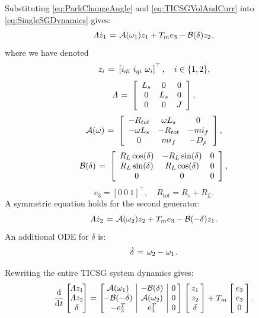 \documentclass[letterpaper,10pt,conference]{ieeeconf}
\renewcommand{\o}    {{\omega}}
\newcommand{\m}      {{\hbox{\hskip 1pt}}}
\newcommand{\nm}     {{\hbox{\hskip -3pt}}}
\newcommand{\dd}     {{\rm d\hbox{\hskip 0.5pt}}}
\begin{document}
Substituting \eqref{eq:ParkChangeAngle} and \eqref{eq:TICSGVolAndCurr}
into \eqref{eq:SingleSGDynamics} gives:
$$ \varLambda\dot{z}_1 \m=\m \mathcal{A}(\o_1)z_1+T_m e_3 - 
   \mathcal{B}(\delta)z_2 \m,$$
where we have denoted
$$ z_i \m=\m \left[i_{di}\ i_{qi}\ \o_i\right]^\top,\quad 
   i\in\{1,2\},$$
$$ \varLambda \m=\m \left[\begin{array}{ccc} L_s & 0 & 0\\
   0 & L_{s} & 0\\ 0 & 0 & J \end{array}\right],$$
$$ \mathcal{A}(\o) \m=\m \left[\begin{array}{ccc}
   -R_{tot} & \o L_s & 0\\ -\o L_s & -R_{tot} & -mi_{f}\\
   0 & mi_{f} & -D_{p} \end{array}\right],$$
$$ \mathcal{B}(\delta) \m=\m \left[\begin{array}{ccc}
   R_L\cos(\delta) & -R_{L}\sin(\delta) & 0\\ R_L\sin(\delta) & 
   R_L\cos(\delta) & 0\\ 0 & 0 & 0 \end{array}\right],$$
$$e_{3}=\left[0\ 0\ 1\right]^\top, \quad  R_{tot}=R_{s}+R_{L}.$$
A symmetric equation holds for the second generator:
$$ \varLambda\dot{z}_2 \m=\m \mathcal{A}(\o_{2})z_{2}+T_{m}e_{3} -
   \mathcal{B}(-\delta)z_{1} \m.$$
An additional ODE for $\delta$ is:
$$\dot{\delta} \m=\m \o_2-\o_1 \m.$$

Rewriting the entire TICSG system dynamics gives:
\begin{equation} \label{eq:TICSGDynamics}
   \frac{\dd}{\dd t}\left[\nm\nm\begin{array}{c} \varLambda z_{1}\\
   \varLambda z_{2}\\ \delta \end{array}\nm\nm\right] = \left[\nm
   \nm\begin{array}{c|c|c} \mathcal{A}(\o_1) & -\mathcal{B}(\delta)
   & 0\\ -\mathcal{B}(-\delta) & \mathcal{A}(\o_2) & 0\\ -e_{3}^T
   & e_3^T & 0 \end{array}\nm\right] \left[\nm\begin{array}{c} z_1
   \\ z_2\\ \delta \end{array}\nm\right] + T_m \left[\nm 
   \begin{array}{c} e_{3}\\ e_{3}\\ 0 \end{array} \nm\right].
\end{equation}
\end{document}
